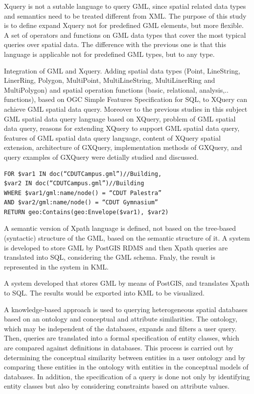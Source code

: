 \documentclass[a4paper,12pt]{article}
\begin{document}
\cite{Lisa2006} Xquery is not a sutable language to query GML, 
since spatial related data types and semantics need to be treated different from XML. 
The purpose of this study is to define expand Xquery not for predefined GML elements, 
but more flexible.  A set of operators and functions on GML data types that cover 
the most typical queries over spatial data. The difference with the previous one is 
that this language is applicable not for predefined GML types, but to any type.

\cite{Chen2010} Integration of GML and Xquery. Adding spatial data types 
(Point, LineString, LinerRing, Polygon, MultiPoint, MultiLineString, MultiLinerRing 
and MultiPolygon) and spatial operation functions (basic, relational, analysis,.. functions), 
based on OGC Simple Features Specification for SQL, to XQuery can achieve GML spatial data query. 
Moreover to the previous studies in this subject GML spatial data query language 
based on XQuery, problem of GML spatial data query, reasons for extending XQuery to
support GML spatial data query, features of GML spatial data query language, 
content of XQuery spatial extension, architecture of GXQuery, implementation methods 
of GXQuery, and query examples of GXQuery were detially studied and discussed. 

\begin{verbatim}
FOR $var1 IN doc(“CDUTCampus.gml”)//Building,
$var2 IN doc(“CDUTCampus.gml”)//Building
WHERE $var1/gml:name/node() = “CDUT Palestra”
AND $var2/gml:name/node() = “CDUT Gymnasium”
RETURN geo:Contains(geo:Envelope($var1), $var2)
\end{verbatim}

\cite{Alemdros2013} A semantic version of Xpath language is defined, not based on the tree-based (syntactic) structure of the GML, based on the semantic structure of it.
A system is developed to store GML by PostGIS RDMS and then Xpath queries are translated into SQL, considering the GML schema. Fnaly, the result is represented in the system in KML.

\cite{Alemdros2011} A system developed that stores GML by means of PostGIS, and translates Xpath to SQL.
The results would be exported into KML to be visualized.

\cite{Gutierrez2004} A knowledge-based approach is used to querying heterogeneous spatial databases based on an ontology and conceptual and attribute similarities. The ontology, which may be independent of the databases, expands and filters a user query. Then, queries are translated into a formal specification of entity classes, which are compared against definitions in databases. This process is carried out by determining the conceptual similarity between entities in a user ontology and by comparing these entities in the ontology with entities in the conceptual models of databases. In addition, the speciﬁcation of a query is done not only by identifying entity classes but also by considering constraints based on attribute values.
\end{document}
